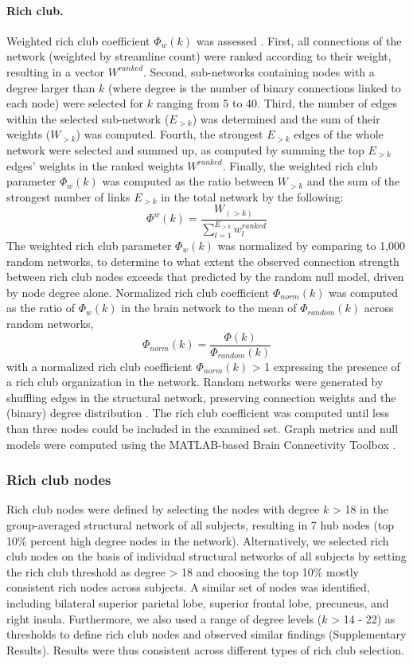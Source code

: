 \begin{refsection}
\paragraph{Rich club.}
Weighted rich club coefficient $\Phi_{w}(k)$ was assessed \citep{Opsahl2008ProminenceAC}. First, all connections of the network (weighted by streamline count) were ranked according to their weight, resulting in a vector $W^{ranked}$. Second, sub-networks containing nodes with a degree larger than $k$ (where degree is the number of binary connections linked to each node) were selected for $k$ ranging from 5 to 40. Third, the number of edges within the selected sub-network ($E_{>k}$) was determined and the sum of their weights ($W_{>k}$) was computed. Fourth, the strongest $E_{>k}$ edges of the whole network were selected and summed up, as computed by summing the top $E_{>k}$ edges’ weights in the ranked weights $W^{ranked}$. Finally, the weighted rich club parameter $\Phi_{w}(k)$ was computed as the ratio between $W_{>k}$ and the sum of the strongest number of links $E_{>k}$ in the total network by the following:
\[\Phi^{w}(k)=\frac{W_(>k)}{\sum_{l=1}^{E_{>k}} w^{ranked}_{l}}\]
The weighted rich club parameter $\Phi_{w}(k)$ was normalized by comparing to 1,000 random networks, to determine to what extent the observed connection strength between rich club nodes exceeds that predicted by the random null model, driven by node degree alone. Normalized rich club coefficient $\Phi_{norm}(k)$ was computed as the ratio of $\Phi_{w}(k)$ in the brain network to the mean of $\Phi_{random}(k)$ across random networks, 
\[\Phi_{norm}(k)=\frac{\Phi(k)}{\Phi_{random}(k)} \]
with a normalized rich club coefficient $\Phi_{norm}(k)$ > 1 expressing the presence of a rich club organization in the network. Random networks were generated by shuffling edges in the structural network, preserving connection weights and the (binary) degree distribution \citep{Maslov2002SpecificityAS}. The rich club coefficient was computed until less than three nodes could be included in the examined set. Graph metrics and null models were computed using the MATLAB-based Brain Connectivity Toolbox \citep{RUBINOV20101059}.

\subsubsection*{Rich club nodes}
Rich club nodes were defined by selecting the nodes with degree $k$ > 18 in the group-averaged structural network of all subjects, resulting in 7 hub nodes (top 10\% percent high degree nodes in the network). Alternatively, we selected rich club nodes on the basis of individual structural networks of all subjects by setting the rich club threshold as degree > 18 and choosing the top 10\% mostly consistent rich nodes across subjects. A similar set of nodes was identified, including bilateral superior parietal lobe, superior frontal lobe, precuneus, and right insula. Furthermore, we also used a range of degree levels ($k$ > 14 - 22) as thresholds to define rich club nodes and observed similar findings (Supplementary Results). Results were thus consistent across different types of rich club selection.


\end{refsection}

